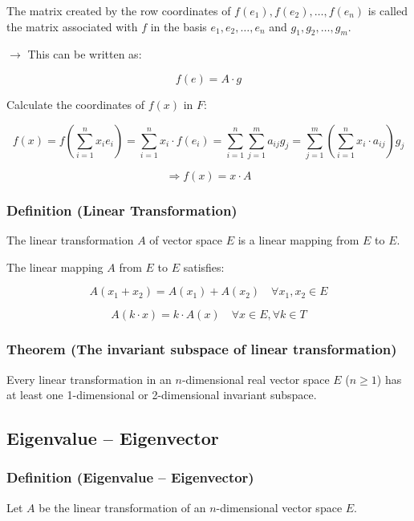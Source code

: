 The matrix created by the row coordinates of $f(e_1), f(e_2), \ldots, f(e_n)$ is called the matrix associated with $f$ in the basis $e_1, e_2, \ldots, e_n$ and $g_1, g_2, \ldots, g_m$.

$\rightarrow$ This can be written as:

\[
f(e) = A \cdot g
\]

Calculate the coordinates of $f(x)$ in $F$:

\begin{equation*}
    f(x) = f\left(\sum_{i=1}^n x_i e_i\right) = \sum_{i=1}^n x_i \cdot f(e_i) = \sum_{i=1}^n \sum_{j=1}^m a_{ij} g_j = \sum_{j=1}^m \left(\sum_{i=1}^n x_i \cdot a_{ij}\right) g_j
\end{equation*}

\[
    \Rightarrow f(x) = x \cdot A
\]

\subsubsection{Definition (Linear Transformation)}

The linear transformation $A$ of vector space $E$ is a linear mapping from $E$ to $E$.

The linear mapping $A$ from $E$ to $E$ satisfies:

\[
A(x_1 + x_2) = A(x_1) + A(x_2) \quad \forall x_1, x_2 \in E
\]

\[
A(k \cdot x) = k \cdot A(x) \quad \forall x \in E, \forall k \in T
\]

\subsubsection{Theorem (The invariant subspace of linear transformation)}

Every linear transformation in an $n$-dimensional real vector space $E$ ($n \geq 1$) has at least one 1-dimensional or 2-dimensional invariant subspace.


\subsection{Eigenvalue – Eigenvector}

\subsubsection{Definition (Eigenvalue – Eigenvector)}

Let $A$ be the linear transformation of an $n$-dimensional vector space $E$.

